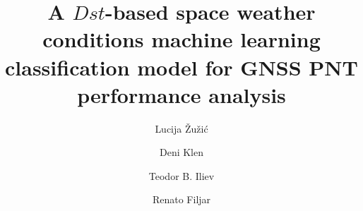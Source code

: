 \documentclass[preprint,12pt]{elsarticle}
\begin{document}
\begin{frontmatter}
\title{A $Dst$-based space weather conditions machine learning classification  model for GNSS PNT performance analysis} %
\author[1,2]{Lucija \v{Z}u\v{z}i\'{c}}
\author[1,2]{Deni Klen}
\author[3]{Teodor B. Iliev}%
\author[1,2,4]{Renato Filjar}%
 

\end{frontmatter}
\end{document}
